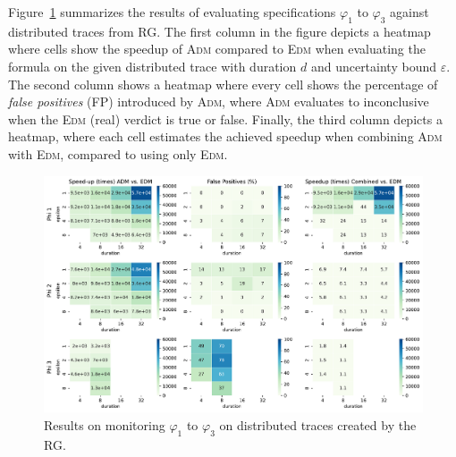 Figure~\ref{fig:rgresults} summarizes the results of evaluating specifications $\varphi_1$ to $\varphi_3$ against distributed traces from RG. The first column in the figure depicts a heatmap where cells show the speedup of \textsc{Adm} compared to \textsc{Edm} when evaluating the formula on the given distributed trace with duration $d$ and uncertainty bound $\varepsilon$. The second column shows a heatmap where every cell shows the percentage of \emph{false positives} (FP) introduced by \textsc{Adm}, where \textsc{Adm} evaluates to inconclusive when the \textsc{Edm} (real) verdict is true or false. Finally, the third column depicts a heatmap, where each cell estimates the achieved speedup when combining \textsc{Adm} with \textsc{Edm}, compared to using only \textsc{Edm}.

\begin{figure}[t]
	\begin{center}
	\includegraphics[width=\linewidth]{speedup}
\caption{Results on monitoring $\varphi_{1}$ to $\varphi_{3}$ on distributed traces created by the RG.}
\label{fig:rgresults}
\end{center}
\end{figure}


